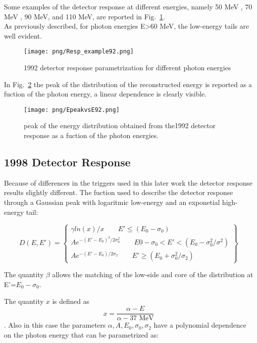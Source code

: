 Some examples of the detector response at different energies, namely 50 MeV , 70 MeV , 90 MeV, and 110 MeV,
 are reported in Fig.~\ref{fig:92ResponseExample}.\\
As previously described, for photon energies E>60 MeV, the low-energy tails are well evident.

\begin{figure}[!h]
\centering
\texttt{[image: png/Resp\_example92.png]}
\caption{1992 detector response parametrization for different photon energies}
\label{fig:92ResponseExample}
\end{figure}


In Fig.~\ref{fig:EpeakvsE92} the peak of the distribution of the reconstructed energy is reported as a fuction of the photon energy, a linear dependence is clearly visible.

\begin{figure}[!h]
\centering
\texttt{[image: png/EpeakvsE92.png]}
\caption{peak of the energy distribution obtained from the1992 detector response as a fuction of the photon energies.}
\label{fig:EpeakvsE92}
\end{figure}

\subsection { 1998 Detector Response }

Because of differences in the triggers used in this later work the detector response results slightly different.
The fuction used to describe the detector response through  a Gaussian peak with logaritmic low-energy  and an exponetial high-energy tail:

\begin{equation}
  D(E,E')= \left\{
    \begin{array}{ll}
      \gamma ln(x)/x          \qquad E' \leq (E_0-\sigma_0) \\
      Ae^{-(E'-E_0)^2/2\sigma_0^2} \qquad E0-\sigma_0<E'<(E_0-\sigma_0^2/\sigma^2) \\
      Ae^{-(E'-E_0)/2\sigma_2}    \qquad E' \geq (E_0+\sigma_0^2/\sigma_2)
    \end{array}
  \right\}
\end{equation}

The quantity $\beta$  allows the matching of the low-side and core of the distribution at E'=$E_0-\sigma_0$.

The quantity $x$ is defined as 
$$x= \frac{\alpha- E}{\alpha -37 \text{ MeV}}$$.
Also in this case the parameters $\alpha,A,E_0,\sigma_0,\sigma_2$ have a polynomial dependence on the photon energy that can be parametrized as:


